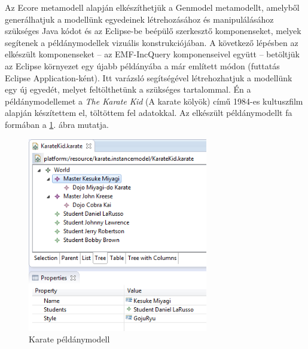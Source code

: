 Az Ecore metamodell alapján elkészíthetjük a Genmodel metamodellt, amelyből generálhatjuk a modellünk egyedeinek létrehozásához és manipulálásához szükséges Java kódot és az Eclipse-be beépülő szerkesztő komponenseket, melyek segítenek a példánymodellek vizuális konstrukciójában.
A következő lépésben az elkészült komponenseket -- az EMF-IncQuery komponenseivel együtt -- betöltjük az Eclipse környezet egy újabb példányába a már említett módon (futtatás Eclipse Application-ként).
Itt varázsló segítségével létrehozhatjuk a modellünk egy új egyedét, melyet feltölthetünk a szükséges tartalommal.
Én a példánymodellemet a \emph{The Karate Kid} (A karate kölyök) című 1984-es kultuszfilm alapján készítettem el, töltöttem fel adatokkal.
Az elkészült példánymodellt fa formában a \ref{fig:karateInstanceModel}. ábra mutatja.
%
\begin{figure}[htb]
\centering
\includegraphics[width=0.70\textwidth]{figures/karate-instance-tree-with-properties.png}
\caption{Karate példánymodell}
\label{fig:karateInstanceModel}
\end{figure}
%

